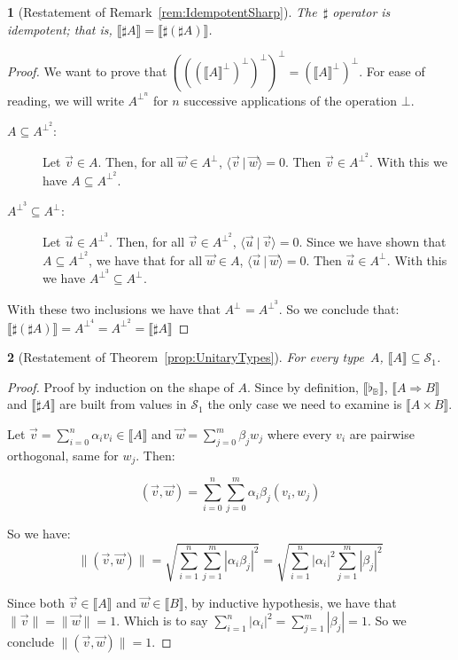 \documentclass[a4paper,UKenglish,numberwithinsect,pdfa,anonymous]{lipics-v2021}
\theoremstyle{restatestyle}
\newtheorem*{restatetheorem}{}
\newcommand\comp[2][]{#2^{\bot^{#1}}}
\def\Sph{\mathcal{S}_1}       %
\def\scal#1#2{\langle{#1}~|~{#2}\rangle}
\def\Pair#1#2{(#1,#2)} %
\def\BB{\mathbb{B}}
\def\Arr{\Rightarrow}
\def\sem#1{\llbracket#1\rrbracket}
\newcommand\basis[1]{\ensuremath{\flat_{#1}}}
\begin{document}
\begin{restatetheorem}[Restatement of Remark~\ref{rem:IdempotentSharp}]
  \itshape
  The~$\sharp$ operator is idempotent; that is,
  $\sem{\sharp A} = \sem{\sharp(\sharp A)}$.
\end{restatetheorem}
\begin{proof}
  We want to prove that $(((\comp{\sem{A}})^\bot)^\bot)^\bot = (\comp{\sem{A}})^\bot$. For ease of reading, we will write $\comp[n]{A}$ for $n$ successive applications of the operation $\bot$.

  \begin{description}
    \item[$A\subseteq A^{\bot^2}$:] Let $\vec{v}\in A$. Then, for all $\vec{w}\in\comp{A}$, $\scal{\vec{v}}{\vec{w}} = 0$. Then $\vec{v}\in\comp[2]{A}$. With this we have $A\subseteq\comp[2]{A}$.
    
    \item[$A^{\bot^3}\subseteq \comp{A}$:] Let $\vec{u}\in \comp[3]{A}$. Then, for all $\vec{v}\in\comp[2]{A}$, $\scal{\vec u}{\vec v} = 0$. Since we have shown that $A\subseteq \comp[2]{A}$, we have that for all $\vec{w}\in A$, $\scal{\vec u}{\vec w} = 0$. Then $\vec u\in\comp{A}$. With this we have $\comp[3]{A}\subseteq \comp{A}$.
  \end{description}

  With these two inclusions we have that $\comp{A}=\comp[3]{A}$. So we conclude that: $\sem{\sharp(\sharp A)} = \comp[4]{A} = \comp[2]{A} = \sem{\sharp A}$ \qedhere
\end{proof}

\begin{restatetheorem}[Restatement of Theorem~\ref{prop:UnitaryTypes}]
  \itshape
  For every type~$A$, $\sem{A}\subseteq\Sph$.
\end{restatetheorem}

\begin{proof}
  Proof by induction on the shape of $A$. Since by definition, $\sem{\basis{\BB}}$, $\sem{A\Arr B}$ and $\sem{\sharp{A}}$ are built from values in $\Sph$ the only case we need to examine is $\sem{A\times B}$.
  
  Let $\vec v = \sum_{i=0}^{n} \alpha_i v_i \in\sem{A}$ and $\vec w = \sum_{j=0}^{m} \beta_j w_j$ where every $v_i$ are pairwise orthogonal, same for $w_j$. Then:
     
  \[(\vec v, \vec w) = \sum_{i=0}^{n} \sum_{j=0}^{m} \alpha_i\beta_j (v_i,w_j)\]
  
  So we have: 
  \[\|\Pair{\vec v}{\vec w}\| = \sqrt{\sum_{i=1}^n\sum_{j=1}^{m} |\alpha_i\beta_j|^2} = \sqrt{\sum_{i=1}^n |\alpha_i|^2 \sum_{j=1}^{m} |\beta_j|^2}\]

  Since both $\vec v\in\sem{A}$ and $\vec w\in\sem{B}$, by inductive hypothesis, we have that $\|\vec v\| = \| \vec w \| = 1$. Which is to say $\sum_{i=1}^{n} |\alpha_i|^2 = \sum_{j=1}^{m} |\beta_j| = 1$. So we conclude $\|\Pair{\vec{v}}{\vec{w}}\| = 1$.
  \qedhere
\end{proof}
\end{document}

